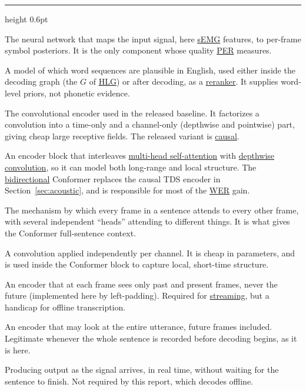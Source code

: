 \documentclass{article}
\providecommand{\textls}[2][]{#2}
\newcommand{\cathead}[1]{%
  \par\addvspace{15pt}\needspace{5\baselineskip}%
  \noindent{\normalsize\scshape\bfseries\textls[70]{#1}}\par
  \vspace{2.5pt}%
  {\color{rulegray}\hrule height 0.6pt}%
  \par\addvspace{8pt}%
}
\DeclareRobustCommand{\glref}[2]{\hyperlink{gl:#1}{\textcolor{glosslink}{#2}}}
\newcommand{\glentry}[2]{\item[\hypertarget{gl:#1}{#2}]}
\newenvironment{glosslist}
  {\begin{description}[style=nextline,leftmargin=2.1em,labelindent=0pt,
      itemsep=5pt,parsep=0pt,topsep=2pt,font=\normalfont\bfseries]}
  {\end{description}}
\DeclareRobustCommand{\wer}{\glref{wer}{WER}}
\DeclareRobustCommand{\per}{\glref{per}{PER}}
\begin{document}
\cathead{Models and architectures}
\begin{glosslist}

\glentry{am}{Acoustic model}
The neural network that maps the input signal, here \glref{semg}{sEMG} features, to per-frame symbol
posteriors. It is the only component whose quality \per{} measures.

\glentry{lm}{Language model}
A model of which word sequences are plausible in English, used either inside the decoding graph (the
$G$ of \glref{hlg}{HLG}) or after decoding, as a \glref{rerank}{reranker}. It supplies word-level
priors, not phonetic evidence.

\glentry{tds}{TDS \textnormal{(time-depth separable convolution)}}
The convolutional encoder used in the released baseline. It factorizes a convolution into a time-only
and a channel-only (depthwise and pointwise) part, giving cheap large receptive fields. The released
variant is \glref{causal}{causal}.

\glentry{conformer}{Conformer}
An encoder block that interleaves \glref{attention}{multi-head self-attention} with
\glref{depthwise}{depthwise convolution}, so it can model both long-range and local structure. The
\glref{bidir}{bidirectional} Conformer replaces the causal TDS encoder in Section~\ref{sec:acoustic},
and is responsible for most of the \wer{} gain.

\glentry{attention}{Multi-head self-attention}
The mechanism by which every frame in a sentence attends to every other frame, with several
independent ``heads'' attending to different things. It is what gives the Conformer full-sentence
context.

\glentry{depthwise}{Depthwise convolution}
A convolution applied independently per channel. It is cheap in parameters, and is used inside the
Conformer block to capture local, short-time structure.

\glentry{causal}{Causal encoder}
An encoder that at each frame sees only past and present frames, never the future (implemented here by
left-padding). Required for \glref{streaming}{streaming}, but a handicap for offline transcription.

\glentry{bidir}{Bidirectional (full-context) encoder}
An encoder that may look at the entire utterance, future frames included. Legitimate whenever the whole
sentence is recorded before decoding begins, as it is here.

\glentry{streaming}{Streaming}
Producing output as the signal arrives, in real time, without waiting for the sentence to finish. Not
required by this report, which decodes offline.


\end{glosslist}
\end{document}
